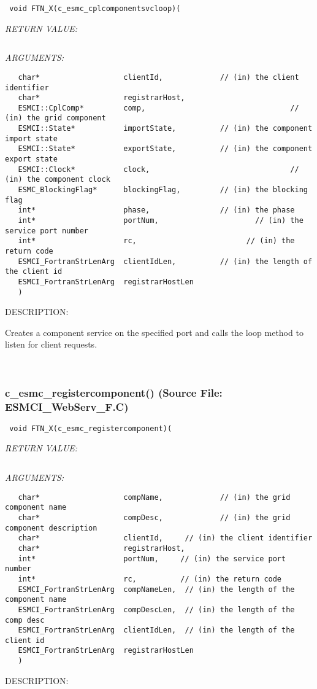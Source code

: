   
\begin{verbatim} void FTN_X(c_esmc_cplcomponentsvcloop)(\end{verbatim}{\em RETURN VALUE:}
\begin{verbatim} \end{verbatim}{\em ARGUMENTS:}
\begin{verbatim}   char*                   clientId,             // (in) the client identifier
   char*                   registrarHost,
   ESMCI::CplComp*         comp,                                 // (in) the grid component
   ESMCI::State*           importState,          // (in) the component import state
   ESMCI::State*           exportState,          // (in) the component export state
   ESMCI::Clock*           clock,                                // (in) the component clock
   ESMC_BlockingFlag*      blockingFlag,         // (in) the blocking flag
   int*                    phase,                // (in) the phase
   int*                    portNum,                      // (in) the service port number
   int*                    rc,                         // (in) the return code
   ESMCI_FortranStrLenArg  clientIdLen,          // (in) the length of the client id
   ESMCI_FortranStrLenArg  registrarHostLen
   )\end{verbatim}
{\sf DESCRIPTION:\\ }


      Creates a component service on the specified port and calls the
      loop method to listen for client requests.
   
 
\mbox{}\hrulefill\
 
\subsubsection{c\_esmc\_registercomponent() (Source File: ESMCI\_WebServ\_F.C)}


  
\begin{verbatim} void FTN_X(c_esmc_registercomponent)(\end{verbatim}{\em RETURN VALUE:}
\begin{verbatim} \end{verbatim}{\em ARGUMENTS:}
\begin{verbatim}   char*                   compName,             // (in) the grid component name
   char*                   compDesc,             // (in) the grid component description
   char*                   clientId,     // (in) the client identifier
   char*                   registrarHost,
   int*                    portNum,     // (in) the service port number
   int*                    rc,          // (in) the return code
   ESMCI_FortranStrLenArg  compNameLen,  // (in) the length of the component name
   ESMCI_FortranStrLenArg  compDescLen,  // (in) the length of the comp desc
   ESMCI_FortranStrLenArg  clientIdLen,  // (in) the length of the client id
   ESMCI_FortranStrLenArg  registrarHostLen
   )\end{verbatim}
{\sf DESCRIPTION:\\ }


